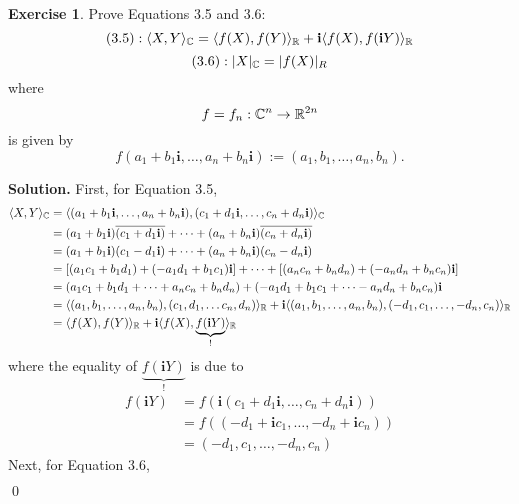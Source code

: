 \documentclass[12pt]{book}
\theoremstyle{definition}
\newtheorem{exercise}{Exercise}[chapter]
\newenvironment{solution}
{%
  \par\noindent\textbf{Solution.}\quad
}
{%
  \qed\par
}
\begin{document}
\begin{exercise}
  Prove Equations 3.5 and 3.6:
  \[
    (3.5) :  \langle X, Y \rangle_{\mathbb{C}} = \langle f(X), f(Y) \rangle_{\mathbb{R}} + \mathbf{i} \langle f(X), f(\mathbf{i}Y) \rangle_{\mathbb{R}}
  \]
  \[
    (3.6) : |X|_{\mathbb{C}} = |f(X)|_R
  \]
  where
  \[
  f = f_n: \mathbb{C}^{n} \to \mathbb{R}^{2n}
  \]
  is given by
  \[
  f(a_1 + b_1\mathbf{i}, \dots , a_n+b_n\mathbf{i}) := (a_1, b_1, \dots, a_n, b_n).
  \]
\end{exercise}

\begin{solution} First, for Equation 3.5,
  \[
  \begin{aligned}
      \langle X, Y \rangle_{\mathbb{C}} &= \langle (a_1 + b_1\mathbf{i}, \dots , a_n + b_n\mathbf{i}), (c_1+d_1\mathbf{i}, \dots , c_n+d_n\mathbf{i}) \rangle_{\mathbb{C}} \\
                              &= (a_1 + b_1\mathbf{i})\overline{(c_1+d_1\mathbf{i})} + \dots + (a_n + b_n\mathbf{i})\overline{(c_n+d_n\mathbf{i})} \\
                              &= (a_1 + b_1\mathbf{i})(c_1-d_1\mathbf{i}) + \dots + (a_n + b_n\mathbf{i})(c_n-d_n\mathbf{i}) \\
                              &= [(a_1c_1 + b_1d_1) + (-a_1d_1 + b_1c_1)\mathbf{i}] + \dots + [(a_nc_n + b_nd_n) + (-a_nd_n + b_nc_n)\mathbf{i}] \\
                              &= (a_1c_1 + b_1d_1 + \dots + a_nc_n + b_nd_n) + (-a_1d_1 + b_1c_1 + \dots - a_nd_n + b_nc_n)\mathbf{i} \\
                              &= \langle (a_1, b_1, \dots , a_n, b_n), (c_1, d_1, \dots c_n, d_n) \rangle_{\mathbb{R}} + \mathbf{i}\langle (a_1, b_1, \dots , a_n, b_n), (-d_1, c_1, \dots , -d_n, c_n) \rangle_{\mathbb{R}} \\
                              &= \langle f(X), f(Y) \rangle_{\mathbb{R}} + \mathbf{i}\langle f(X), \underbrace{f(\mathbf{i}Y)}_! \rangle_{\mathbb{R}}
    \end{aligned}
  \]
  where the equality of $\underbrace{f(\mathbf{i}Y)}_!$ is due to
  \[
  \begin{aligned}
    f(\mathbf{i}Y) &= f(\mathbf{i}(c_1 + d_1\mathbf{i}, \dots , c_n + d_n\mathbf{i})) \\
                   &= f((-d_1 + \mathbf{i}c_1, \dots, -d_n + \mathbf{i}c_n)) \\
                   &= (-d_1, c_1, \dots, -d_n, c_n)
  \end{aligned}
  \]
  Next, for Equation 3.6,
  \[
  \begin{aligned}

\end{aligned}\]
\end{solution}
\end{document}
